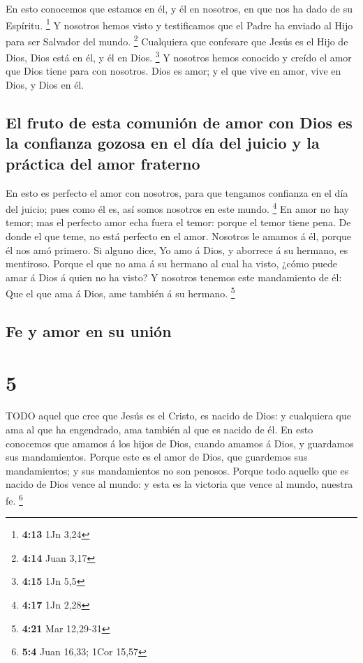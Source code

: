  En esto conocemos que estamos en él, y él en nosotros, en
que nos ha dado de su Espíritu. \footnote{\textbf{4:13} 1Jn 3,24}
 Y nosotros hemos visto y testificamos que el Padre ha
enviado al Hijo para ser Salvador del mundo. \footnote{\textbf{4:14}
  Juan 3,17}  Cualquiera que confesare que Jesús es el Hijo
de Dios, Dios está en él, y él en Dios. \footnote{\textbf{4:15} 1Jn 5,5}
 Y nosotros hemos conocido y creído el amor que Dios tiene
para con nosotros. Dios es amor; y el que vive en amor, vive en Dios, y
Dios en él.

\hypertarget{el-fruto-de-esta-comuniuxf3n-de-amor-con-dios-es-la-confianza-gozosa-en-el-duxeda-del-juicio-y-la-pruxe1ctica-del-amor-fraterno}{%
\subsection{El fruto de esta comunión de amor con Dios es la confianza
gozosa en el día del juicio y la práctica del amor
fraterno}\label{el-fruto-de-esta-comuniuxf3n-de-amor-con-dios-es-la-confianza-gozosa-en-el-duxeda-del-juicio-y-la-pruxe1ctica-del-amor-fraterno}}

 En esto es perfecto el amor con nosotros, para que
tengamos confianza en el día del juicio; pues como él es, así somos
nosotros en este mundo. \footnote{\textbf{4:17} 1Jn 2,28} 
En amor no hay temor; mas el perfecto amor echa fuera el temor: porque
el temor tiene pena. De donde el que teme, no está perfecto en el amor.
 Nosotros le amamos á él, porque él nos amó primero.
 Si alguno dice, Yo amo á Dios, y aborrece á su hermano, es
mentiroso. Porque el que no ama á su hermano al cual ha visto, ¿cómo
puede amar á Dios á quien no ha visto?  Y nosotros tenemos
este mandamiento de él: Que el que ama á Dios, ame también á su hermano.
\footnote{\textbf{4:21} Mar 12,29-31}

\hypertarget{fe-y-amor-en-su-uniuxf3n}{%
\subsection{Fe y amor en su unión}\label{fe-y-amor-en-su-uniuxf3n}}

\hypertarget{section-4}{%
\section{5}\label{section-4}}

 TODO aquel que cree que Jesús es el Cristo, es nacido de
Dios: y cualquiera que ama al que ha engendrado, ama también al que es
nacido de él.  En esto conocemos que amamos á los hijos de
Dios, cuando amamos á Dios, y guardamos sus mandamientos. 
Porque este es el amor de Dios, que guardemos sus mandamientos; y sus
mandamientos no son penosos.  Porque todo aquello que es
nacido de Dios vence al mundo: y esta es la victoria que vence al mundo,
nuestra fe. \footnote{\textbf{5:4} Juan 16,33; 1Cor 15,57}

